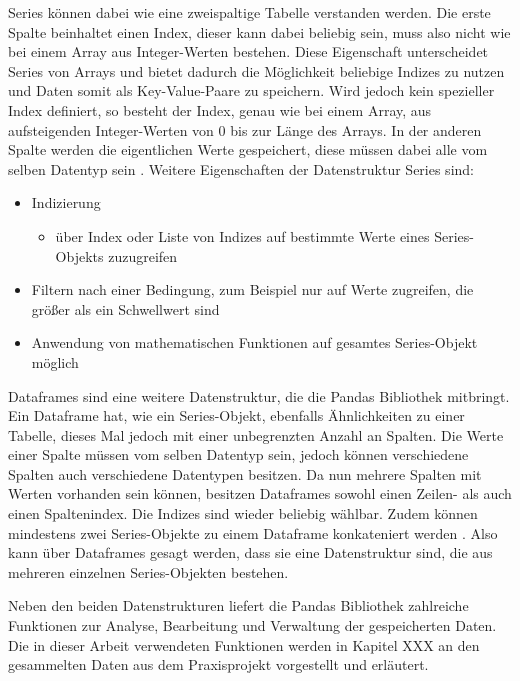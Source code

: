 Series können dabei wie eine zweispaltige Tabelle verstanden werden. Die erste Spalte beinhaltet einen Index, dieser kann
dabei beliebig sein, muss also nicht wie bei einem Array aus Integer-Werten bestehen. Diese Eigenschaft unterscheidet Series von Arrays
und bietet dadurch die Möglichkeit beliebige Indizes zu nutzen und Daten somit als Key-Value-Paare zu speichern. Wird jedoch kein spezieller Index definiert,
so besteht der Index, genau wie bei einem Array, aus aufsteigenden Integer-Werten von 0 bis zur Länge des Arrays. In der anderen Spalte
werden die eigentlichen Werte gespeichert, diese müssen dabei alle vom selben Datentyp sein \cite[vgl. S.254f.]{NumerischesPython}. 
Weitere Eigenschaften der Datenstruktur Series sind:
\begin{itemize}
    \item Indizierung \cite[vgl. S.256]{NumerischesPython}
    \begin{itemize}
        \item über Index oder Liste von Indizes auf bestimmte Werte eines Series-Objekts zuzugreifen
    \end{itemize}
    \item Filtern nach einer Bedingung, zum Beispiel nur auf Werte zugreifen, die größer als ein Schwellwert sind \cite[vgl. S.256]{NumerischesPython}
    \item Anwendung von mathematischen Funktionen auf gesamtes Series-Objekt möglich \cite[vgl. S.256]{NumerischesPython}
\end{itemize}

Dataframes sind eine weitere Datenstruktur, die die Pandas Bibliothek mitbringt. Ein Dataframe hat, wie ein Series-Objekt, ebenfalls Ähnlichkeiten zu einer Tabelle,
dieses Mal jedoch mit einer unbegrenzten Anzahl an Spalten. Die Werte einer Spalte müssen vom selben Datentyp sein, jedoch können verschiedene Spalten 
auch verschiedene Datentypen besitzen. Da nun mehrere Spalten mit Werten vorhanden sein können, besitzen Dataframes sowohl einen Zeilen- als auch einen
Spaltenindex. Die Indizes sind wieder beliebig wählbar. Zudem können mindestens zwei Series-Objekte zu einem Dataframe
konkateniert werden \cite[vgl. S.263f.]{NumerischesPython}. Also kann über Dataframes gesagt werden, dass sie eine Datenstruktur sind, die aus mehreren einzelnen Series-Objekten bestehen.

Neben den beiden Datenstrukturen liefert die Pandas Bibliothek zahlreiche Funktionen zur Analyse, Bearbeitung und Verwaltung der gespeicherten Daten. Die in dieser Arbeit 
verwendeten Funktionen werden in Kapitel XXX an den gesammelten Daten aus dem Praxisprojekt vorgestellt und erläutert.

